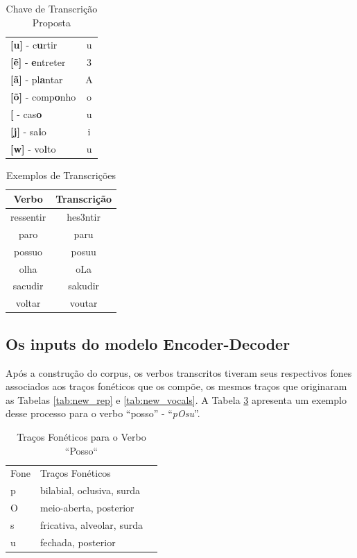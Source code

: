 \begin{table}[H]
\begin{center}
\begin{tabular}{lc}
\textbf{{[}u{]}} - c\textbf{u}rtir & u \\
\textbf{{[}\~e{]}} - \textbf{e}ntreter & 3 \\
\textbf{{[}ã{]}} - pl\textbf{a}ntar & A \\
\textbf{{[}\~o{]}} - comp\textbf{o}nho & o \\
\textbf{{[}\textupsilon{]}} - cas\textbf{o} & u \\
\textbf{{[}j{]}} - sa\textbf{i}o & i \\
\textbf{{[}w{]}} - vo\textbf{l}to & u
\end{tabular}
\end{center}
\caption{Chave de Transcrição Proposta}
\label{tab:chave}
\end{table}

\begin{table}[H]
\begin{center}
\begin{tabular}{cc}
\hline
\textbf{Verbo} & \textbf{Transcrição} \\ \hline
ressentir & hes3ntir \\
paro & paru \\
possuo & posuu \\
olha & oLa \\
sacudir & sakudir \\
voltar & voutar \\ \hline
\end{tabular}
\end{center}
\caption{Exemplos de Transcrições}
\label{tab:transc}
\end{table}






\subsection{Os inputs do modelo Encoder-Decoder}
\label{sec:inputs}

Após a construção do corpus, os verbos transcritos tiveram seus respectivos fones associados aos traços fonéticos que os compõe, os mesmos traços que originaram as Tabelas \ref{tab:new_rep} e \ref{tab:new_vocals}. A Tabela \ref{tab:pOsu} apresenta um exemplo desse processo para o verbo “posso” - “\textit{pOsu}”. 

\begin{table}[H]
\begin{center}
\begin{tabular}{lll}
Fone & Traços Fonéticos &  \\ \cline{1-2}
p & bilabial, oclusiva, surda &  \\
O & meio-aberta, posterior &  \\
s & fricativa, alveolar, surda &  \\
u & fechada, posterior & 
\end{tabular}
\end{center}
\caption{Traços Fonéticos para o Verbo “Posso“}
\label{tab:pOsu}
\end{table}

